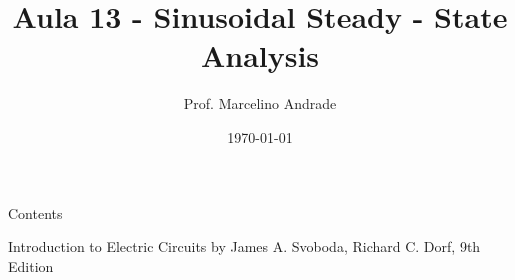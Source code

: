 \documentclass[aspectratio=169]{beamer}
\title[\sc{Teoria de Circuitos Eletrônicos 1}]{\LARGE Aula 13 - Sinusoidal Steady - State Analysis}
\author[Prof. Marcelino Andrade]{Prof. Marcelino Andrade}
\institute{Faculdade UnB Gama} %
\date{\today}
\begin{document}
\justifying %
\pagebreak

\begin{frame}
  \titlepage
\end{frame}


\begin{frame}{Contents}

\tableofcontents
     		Introduction to Electric Circuits by James A. Svoboda, Richard C. Dorf, 9th Edition 
\end{frame}

\end{document}
